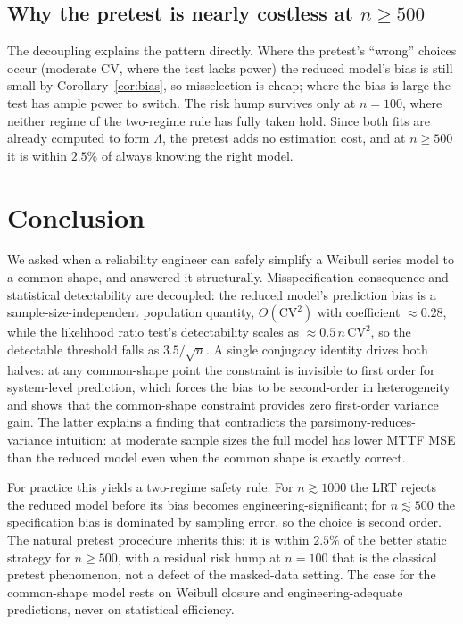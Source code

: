 \documentclass[11pt]{article}
\newcommand{\CV}{\mathrm{CV}}
\begin{document}
\subsection{Why the pretest is nearly costless at $n \geq 500$}

The decoupling explains the pattern directly. Where the pretest's ``wrong'' choices occur (moderate $\CV$, where the test lacks power) the reduced model's bias is still small by Corollary~\ref{cor:bias}, so misselection is cheap; where the bias is large the test has ample power to switch. The risk hump survives only at $n=100$, where neither regime of the two-regime rule has fully taken hold. Since both fits are already computed to form $\Lambda$, the pretest adds no estimation cost, and at $n \geq 500$ it is within $2.5\%$ of always knowing the right model.

\section{Conclusion}
\label{sec:conclusion}

We asked when a reliability engineer can safely simplify a Weibull series model to a common shape, and answered it structurally. Misspecification consequence and statistical detectability are decoupled: the reduced model's prediction bias is a sample-size-independent population quantity, $O(\CV^2)$ with coefficient $\approx 0.28$, while the likelihood ratio test's detectability scales as $\approx 0.5\,n\,\CV^2$, so the detectable threshold falls as $3.5/\sqrt{n}$. A single conjugacy identity drives both halves: at any common-shape point the constraint is invisible to first order for system-level prediction, which forces the bias to be second-order in heterogeneity and shows that the common-shape constraint provides zero first-order variance gain. The latter explains a finding that contradicts the parsimony-reduces-variance intuition: at moderate sample sizes the full model has lower MTTF MSE than the reduced model even when the common shape is exactly correct.

For practice this yields a two-regime safety rule. For $n \gtrsim 1000$ the LRT rejects the reduced model before its bias becomes engineering-significant; for $n \lesssim 500$ the specification bias is dominated by sampling error, so the choice is second order. The natural pretest procedure inherits this: it is within $2.5\%$ of the better static strategy for $n \geq 500$, with a residual risk hump at $n = 100$ that is the classical pretest phenomenon, not a defect of the masked-data setting. The case for the common-shape model rests on Weibull closure and engineering-adequate predictions, never on statistical efficiency.
\end{document}
